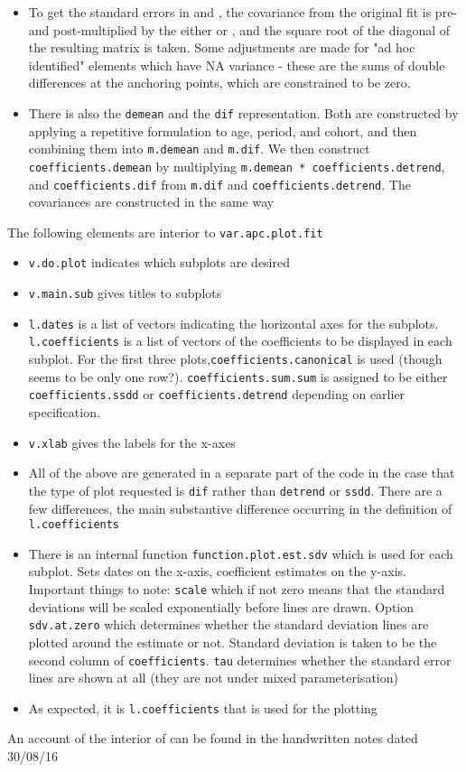 \documentclass{article}
\begin{document}
\begin{itemize}
\item To get the standard errors in  and , the covariance from the original fit is pre- and post-multiplied by the either  or , and the square root of the diagonal of the resulting matrix is taken. Some adjustments are made for "ad hoc identified" elements which have NA variance - these are the sums of double differences at the anchoring points, which are constrained to be zero.
\item There is also the \texttt{demean} and the \texttt{dif} representation. Both are constructed by applying a repetitive formulation to age, period, and cohort, and then combining them into \texttt{m.demean} and \texttt{m.dif}. We then construct \texttt{coefficients.demean} by multiplying \texttt{m.demean * coefficients.detrend}, and \texttt{coefficients.dif} from \texttt{m.dif} and \texttt{coefficients.detrend}. The covariances are constructed in the same way  
\end{itemize}

The following elements are interior to \texttt{var.apc.plot.fit}
\begin{itemize}
\item \texttt{v.do.plot} indicates which subplots are desired
\item \texttt{v.main.sub} gives titles to subplots
\item \texttt{l.dates} is a list of vectors indicating the horizontal axes for the subplots. \texttt{l.coefficients} is a list of vectors of the coefficients to be displayed in each subplot. For the first three plots,\texttt{coefficients.canonical} is used (though seems to be only one row?). \texttt{coefficients.sum.sum} is assigned to be either \texttt{coefficients.ssdd} or \texttt{coefficients.detrend} depending on earlier specification.
\item \texttt{v.xlab} gives the labels for the x-axes
\item All of the above are generated in a separate part of the code in the case that the type of plot requested is \texttt{dif} rather than \texttt{detrend} or \texttt{ssdd}. There are a few differences, the main substantive difference occurring in the definition of \texttt{l.coefficients}
\item There is an internal function \texttt{function.plot.est.sdv} which is used for each subplot. Sets dates on the x-axis, coefficient estimates on the y-axis. Important things to note: \texttt{scale} which if not zero means that the standard deviations will be scaled exponentially before lines are drawn. Option \texttt{sdv.at.zero} which determines whether the standard deviation lines are plotted around the estimate or not. Standard deviation is taken to be the second column of \texttt{coefficients}. \texttt{tau} determines whether the standard error lines are shown at all (they are not under mixed parameterisation)
\item As expected, it is \texttt{l.coefficients} that is used for the plotting
\end{itemize}

An account of the interior of  can be found in the handwritten notes dated 30/08/16
\end{document}

